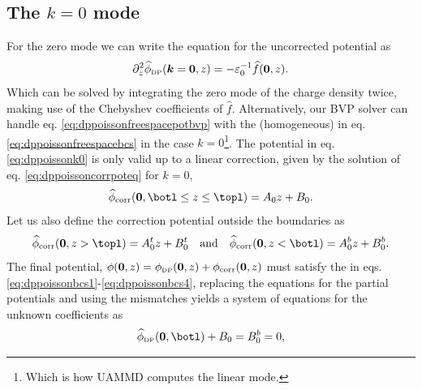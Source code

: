 \documentclass[ twoside,openright,titlepage,numbers=noenddot,%
headinclude,footinclude,cleardoublepage=empty,abstract=on,
BCOR=5mm,paper=a4,fontsize=11pt, dvipsnames
]{scrreprt}
\renewcommand{\vec}[1]{\bm{#1}}
\newcommand{\uammd}{\gls{UAMMD}\xspace}
\newcommand{\fou}[1]{\widehat{#1}}
\newcommand{\corr}{\text{corr}}
\newcommand{\dpr}{\text{\tiny DP}}
\begin{document}
\subsection{The $k=0$ mode}\label{sec:dpelectroneutral}
For the zero mode we can write the equation for the uncorrected potential as
\begin{equation}
  \label{eq:dppoissonk0}
  \partial_z ^2\fou{\phi}_{\dpr}(\vec{k}=\vec{0}, z) = -  \varepsilon_0^{-1}\fou{f}(\vec{0}, z).
\end{equation}
Which can be solved by integrating the zero mode of the charge density twice, making use of the Chebyshev coefficients of $\fou{f}$. Alternatively, our \gls{BVP} solver can handle eq. \eqref{eq:dppoissonfreespacepotbvp} with the (homogeneous) \bcs in eq. \eqref{eq:dppoissonfreespacebcs} in the case $k=0$\footnote{Which is how \uammd computes the linear mode.}.
The potential in eq. \eqref{eq:dppoissonk0} is only valid up to a linear correction, given by the solution of eq. \eqref{eq:dppoissoncorrpoteq} for $k=0$,
\begin{equation}
  \fou{\phi}_{\corr}(\vec{0}, \botl\le z\le \topl) = A_0z + B_0.
\end{equation}
Let us also define the correction potential outside the boundaries as
\begin{equation}
  \fou{\phi}_{\corr}(\vec{0}, z> \topl) = A^t_0z + B^t_0 \quad\text{and}\quad \fou{\phi}_{\corr}(\vec{0}, z<\botl) = A^b_0z + B^b_0.
\end{equation}
The final potential, $\phi(\vec{0},z) = \phi_{\dpr}(\vec{0},z) + \phi_{\corr}(\vec{0},z)$ must satisfy the \bcs in eqs. \eqref{eq:dppoissonbcs1}-\eqref{eq:dppoissonbcs4}, replacing the equations for the partial potentials and using the mismatches yields a system of equations for the unknown coefficients as
\begin{equation}
  \label{eq:dppoissonB0}
  \fou{\phi}_{\dpr}(\vec{0}, \botl) + B_0 = B_0^b = 0,
\end{equation}
\end{document}
